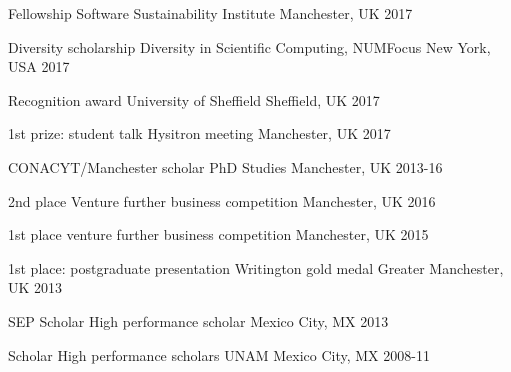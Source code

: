 




\begin{cvhonors}

\cvhonor
{Fellowship} %
{Software Sustainability Institute}
{Manchester, UK}
{2017}

\cvhonor
{Diversity scholarship} %
{Diversity in Scientific Computing, NUMFocus}
{New York, USA}
{2017}

\cvhonor
{Recognition award} %
{University of Sheffield}
{Sheffield, UK}
{2017}

\cvhonor
{1st prize: student talk}
{Hysitron meeting}
{Manchester, UK}
{2017}



\cvhonor
{CONACYT/Manchester scholar} %
{PhD Studies} %
{Manchester, UK} %
{2013-16} %



\cvhonor
{2nd place}
{Venture further business competition}
{Manchester, UK}
{2016}



\cvhonor
{1st place}
{venture further business competition}
{Manchester, UK}
{2015}



\cvhonor
{1st place: postgraduate presentation}
{Writington gold medal}
{Greater Manchester, UK}
{2013}




\cvhonor
{SEP Scholar}
{High performance scholar}
{Mexico City, MX}
{2013}



\cvhonor
{Scholar}
{High performance scholars UNAM}
{Mexico City, MX}
{2008-11}




\end{cvhonors}




